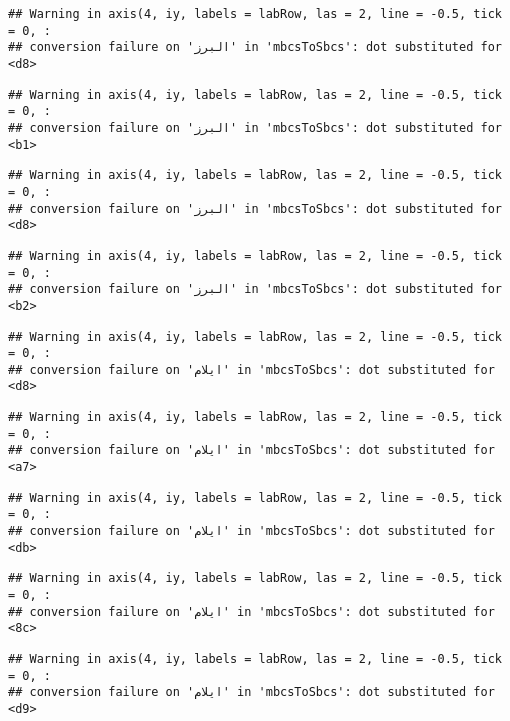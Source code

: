 \documentclass[
]{article}
\begin{document}
\begin{verbatim}
## Warning in axis(4, iy, labels = labRow, las = 2, line = -0.5, tick = 0, :
## conversion failure on 'البرز' in 'mbcsToSbcs': dot substituted for <d8>
\end{verbatim}

\begin{verbatim}
## Warning in axis(4, iy, labels = labRow, las = 2, line = -0.5, tick = 0, :
## conversion failure on 'البرز' in 'mbcsToSbcs': dot substituted for <b1>
\end{verbatim}

\begin{verbatim}
## Warning in axis(4, iy, labels = labRow, las = 2, line = -0.5, tick = 0, :
## conversion failure on 'البرز' in 'mbcsToSbcs': dot substituted for <d8>
\end{verbatim}

\begin{verbatim}
## Warning in axis(4, iy, labels = labRow, las = 2, line = -0.5, tick = 0, :
## conversion failure on 'البرز' in 'mbcsToSbcs': dot substituted for <b2>
\end{verbatim}

\begin{verbatim}
## Warning in axis(4, iy, labels = labRow, las = 2, line = -0.5, tick = 0, :
## conversion failure on 'ایلام' in 'mbcsToSbcs': dot substituted for <d8>
\end{verbatim}

\begin{verbatim}
## Warning in axis(4, iy, labels = labRow, las = 2, line = -0.5, tick = 0, :
## conversion failure on 'ایلام' in 'mbcsToSbcs': dot substituted for <a7>
\end{verbatim}

\begin{verbatim}
## Warning in axis(4, iy, labels = labRow, las = 2, line = -0.5, tick = 0, :
## conversion failure on 'ایلام' in 'mbcsToSbcs': dot substituted for <db>
\end{verbatim}

\begin{verbatim}
## Warning in axis(4, iy, labels = labRow, las = 2, line = -0.5, tick = 0, :
## conversion failure on 'ایلام' in 'mbcsToSbcs': dot substituted for <8c>
\end{verbatim}

\begin{verbatim}
## Warning in axis(4, iy, labels = labRow, las = 2, line = -0.5, tick = 0, :
## conversion failure on 'ایلام' in 'mbcsToSbcs': dot substituted for <d9>
\end{verbatim}
\end{document}
